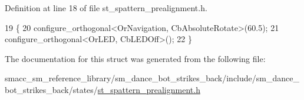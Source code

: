 Definition at line 18 of file st\+\_\+spattern\+\_\+prealignment.\+h.


\begin{DoxyCode}
19   \{
20     configure\_orthogonal<OrNavigation, CbAbsoluteRotate>(60.5);
21     configure\_orthogonal<OrLED, CbLEDOff>();
22   \}
\end{DoxyCode}


The documentation for this struct was generated from the following file\+:\begin{DoxyCompactItemize}
\item 
smacc\+\_\+sm\+\_\+reference\+\_\+library/sm\+\_\+dance\+\_\+bot\+\_\+strikes\+\_\+back/include/sm\+\_\+dance\+\_\+bot\+\_\+strikes\+\_\+back/states/\hyperlink{st__spattern__prealignment_8h}{st\+\_\+spattern\+\_\+prealignment.\+h}\end{DoxyCompactItemize}
